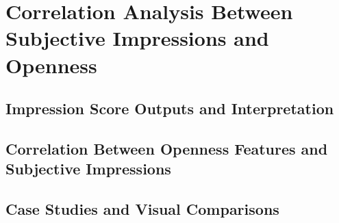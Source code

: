 \chapter{Correlation Analysis Between Subjective Impressions and Openness}

\section{Impression Score Outputs and Interpretation}

\section{Correlation Between Openness Features and Subjective Impressions}

\section{Case Studies and Visual Comparisons}
